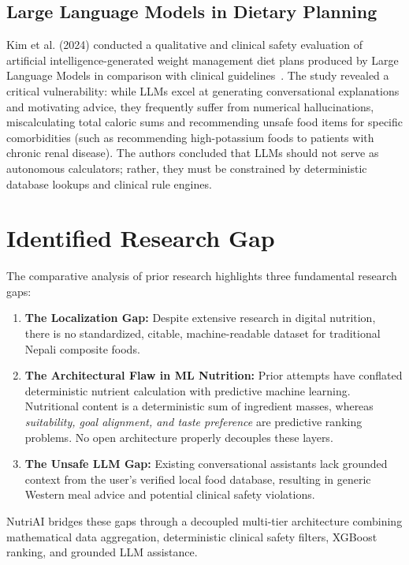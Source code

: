 \documentclass[12pt,a4paper]{report}
\begin{document}
\subsection{Large Language Models in Dietary Planning}
Kim et al. (2024) conducted a qualitative and clinical safety evaluation of artificial intelligence-generated weight management diet plans produced by Large Language Models in comparison with clinical guidelines~\cite{kim2024}. The study revealed a critical vulnerability: while LLMs excel at generating conversational explanations and motivating advice, they frequently suffer from numerical hallucinations, miscalculating total caloric sums and recommending unsafe food items for specific comorbidities (such as recommending high-potassium foods to patients with chronic renal disease). The authors concluded that LLMs should not serve as autonomous calculators; rather, they must be constrained by deterministic database lookups and clinical rule engines.

\section{Identified Research Gap}

The comparative analysis of prior research highlights three fundamental research gaps:
\begin{enumerate}[leftmargin=*]
  \item \textbf{The Localization Gap:} Despite extensive research in digital nutrition, there is no standardized, citable, machine-readable dataset for traditional Nepali composite foods.
  \item \textbf{The Architectural Flaw in ML Nutrition:} Prior attempts have conflated deterministic nutrient calculation with predictive machine learning. Nutritional content is a deterministic sum of ingredient masses, whereas \textit{suitability, goal alignment, and taste preference} are predictive ranking problems. No open architecture properly decouples these layers.
  \item \textbf{The Unsafe LLM Gap:} Existing conversational assistants lack grounded context from the user's verified local food database, resulting in generic Western meal advice and potential clinical safety violations.
\end{enumerate}

NutriAI bridges these gaps through a decoupled multi-tier architecture combining mathematical data aggregation, deterministic clinical safety filters, XGBoost ranking, and grounded LLM assistance.
\end{document}
